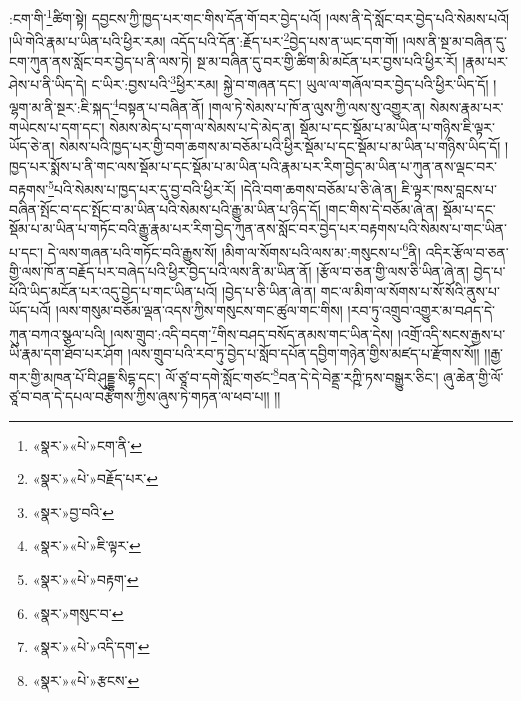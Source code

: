 :ངག་གི་\footnote{«སྣར་»«པེ་»ངག་ནི་}ཚིག་སྟེ། དབྱངས་ཀྱི་ཁྱད་པར་གང་གིས་དོན་གོ་བར་བྱེད་པའོ། །ལས་ནི་དེ་སློང་བར་བྱེད་པའི་སེམས་པའོ། །ཡི་གེའི་རྣམ་པ་ཡིན་པའི་ཕྱིར་རམ། འདོད་པའི་དོན་:རྗོད་པར་\footnote{«སྣར་»«པེ་»བརྗོད་པར་}བྱེད་པས་ན་ཡང་དག་གོ། །ལས་ནི་སྔ་མ་བཞིན་དུ་ངག་ཀུན་ནས་སློང་བར་བྱེད་པ་ནི་ལས་ཏེ། སྔ་མ་བཞིན་དུ་བར་གྱི་ཚིག་མི་མངོན་པར་བྱས་པའི་ཕྱིར་རོ། །རྣམ་པར་ཤེས་པ་ནི་ཡིད་དེ། ང་ཡིར་:བྱས་པའི་\footnote{«སྣར་»བྱ་བའི་}ཕྱིར་རམ། སྐྱེ་བ་གཞན་དང་། ཡུལ་ལ་གཞོལ་བར་བྱེད་པའི་ཕྱིར་ཡིད་དོ། །ལྷག་མ་ནི་སྔར་:ཇི་སྐད་\footnote{«སྣར་»«པེ་»ཇི་ལྟར་}བསྟན་པ་བཞིན་ནོ། །གལ་ཏེ་སེམས་པ་ཁོ་ན་ལུས་ཀྱི་ལས་སུ་འགྱུར་ན། སེམས་རྣམ་པར་གཡེངས་པ་དག་དང་། སེམས་མེད་པ་དག་ལ་སེམས་པ་དེ་མེད་ན། སྡོམ་པ་དང་སྡོམ་པ་མ་ཡིན་པ་གཉིས་ཇི་ལྟར་ཡོད་ཅེ་ན། སེམས་པའི་ཁྱད་པར་གྱི་བག་ཆགས་མ་བཅོམ་པའི་ཕྱིར་སྡོམ་པ་དང་སྡོམ་པ་མ་ཡིན་པ་གཉིས་ཡིད་དོ། །ཁྱད་པར་སྨོས་པ་ནི་གང་ལས་སྡོམ་པ་དང་སྡོམ་པ་མ་ཡིན་པའི་རྣམ་པར་རིག་བྱེད་མ་ཡིན་པ་ཀུན་ནས་ལྡང་བར་བརྟགས་\footnote{«སྣར་»«པེ་»བརྟག་}པའི་སེམས་པ་ཁྱད་པར་དུ་བྱ་བའི་ཕྱིར་རོ། །དེའི་བག་ཆགས་བཅོམ་པ་ཅི་ཞེ་ན། ཇི་ལྟར་ཁས་བླངས་པ་བཞིན་སྤོང་བ་དང་སྤོང་བ་མ་ཡིན་པའི་སེམས་པའི་རྒྱུ་མ་ཡིན་པ་ཉིད་དོ། །གང་གིས་དེ་བཅོམ་ཞེ་ན། སྡོམ་པ་དང་སྡོམ་པ་མ་ཡིན་པ་གཏོང་བའི་རྒྱུ་རྣམ་པར་རིག་བྱེད་ཀུན་ནས་སློང་བར་བྱེད་པར་བརྟགས་པའི་སེམས་པ་གང་ཡིན་པ་དང་། དེ་ལས་གཞན་པའི་གཏོང་བའི་རྒྱུས་སོ། །མིག་ལ་སོགས་པའི་ལས་མ་:གསུངས་པ་\footnote{«སྣར་»གསུང་བ་}ནི། འདིར་རྩོལ་བ་ཅན་གྱི་ལས་ཁོ་ན་བརྗོད་པར་བཞེད་པའི་ཕྱིར་བྱེད་པའི་ལས་ནི་མ་ཡིན་ནོ། །རྩོལ་བ་ཅན་གྱི་ལས་ཅི་ཡིན་ཞེ་ན། བྱེད་པ་པོའི་ཡིད་མངོན་པར་འདུ་བྱེད་པ་གང་ཡིན་པའོ། །བྱེད་པ་ཅི་ཡིན་ཞེ་ན། གང་ལ་མིག་ལ་སོགས་པ་སོ་སོའི་ནུས་པ་ཡོད་པའོ། །ལས་གསུམ་བཅོམ་ལྡན་འདས་ཀྱིས་གསུངས་གང་ཚུལ་གང་གིས། །རབ་ཏུ་འགྲུབ་འགྱུར་མ་བཤད་དེ་ཀུན་བཀའ་སྩལ་པའི། །ལས་གྲུབ་:འདི་བདག་\footnote{«སྣར་»«པེ་»འདི་དག་}གིས་བཤད་བསོད་ནམས་གང་ཡིན་དེས། །འགྲོ་འདི་སངས་རྒྱས་པ་ཡི་རྣམ་དག་ཐོབ་པར་ཤོག །ལས་གྲུབ་པའི་རབ་ཏུ་བྱེད་པ་སློབ་དཔོན་དབྱིག་གཉེན་གྱིས་མཛད་པ་རྫོགས་སོ།། །།རྒྱ་གར་གྱི་མཁན་པོ་བི་ཤུདྡྷ་སིདྷ་དང་། ལོ་ཙཱ་བ་དགེ་སློང་གཙང་\footnote{«སྣར་»«པེ་»རྩངས་}བན་དེ་དེ་བེནྡྲ་རཀྵི་ཏས་བསྒྱུར་ཅིང་། ཞུ་ཆེན་གྱི་ལོ་ཙཱ་བ་བན་དེ་དཔལ་བརྩེགས་ཀྱིས་ཞུས་ཏེ་གཏན་ལ་ཕབ་པ།། །།